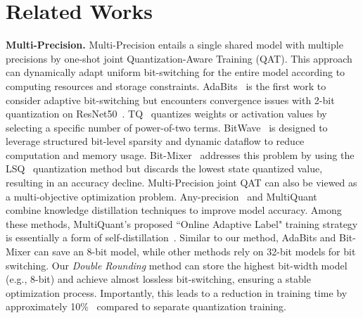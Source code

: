 \section{Related Works}

{\bf Multi-Precision.}
Multi-Precision entails a single shared model with multiple precisions by one-shot joint Quantization-Aware Training (QAT). This approach can dynamically adapt uniform bit-switching for the entire model according to computing resources and storage constraints. AdaBits~\cite{Jin2019} is the first work to consider adaptive bit-switching but encounters convergence issues with 2-bit quantization on ResNet50~\cite{He2015}. TQ~\cite{zhang2021training} quantizes weights or activation values by selecting a specific number of power-of-two terms. BitWave~\cite{shi2024bitwave} is designed to leverage structured bit-level sparsity and dynamic dataflow to reduce computation and memory usage. Bit-Mixer~\cite{Bulat2021} addresses this problem by using the LSQ~\cite{Esser2019} quantization method but discards the lowest state quantized value, resulting in an accuracy decline. Multi-Precision joint QAT can also be viewed as a multi-objective optimization problem. Any-precision~\cite{Yu2021} and MultiQuant~\cite{Xu2022} combine knowledge distillation techniques to improve model accuracy. Among these methods, MultiQuant's proposed ``Online Adaptive Label" training strategy is essentially a form of self-distillation~\cite{kim2021self}. Similar to our method, AdaBits and Bit-Mixer can save an 8-bit model, while other methods rely on 32-bit models for bit switching. Our \emph{Double Rounding} method can store the highest bit-width model (e.g., 8-bit) and achieve almost lossless bit-switching, ensuring a stable optimization process. Importantly, this leads to a reduction in training time by approximately 10\%~\cite{Du2020} compared to separate quantization training.

